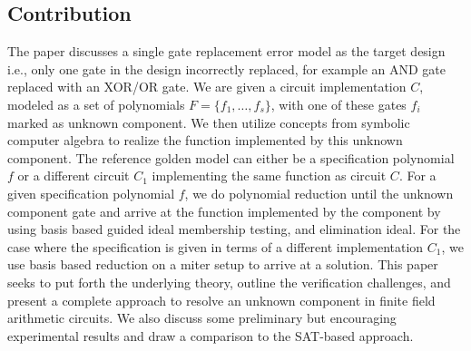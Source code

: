 \subsection{Contribution}
The paper discusses a single gate replacement error model as the target design i.e., only one gate in the design incorrectly replaced, for example an AND gate replaced with an XOR/OR gate. We are given a circuit implementation $C$, modeled as a set of polynomials $F=\{f_1,\dots,f_s\}$, with one of these gates $f_i$ marked as unknown component. We then utilize concepts from symbolic computer algebra to realize the function implemented by this unknown component. The reference golden model can either be a specification polynomial $f$ or a different circuit $C_1$ implementing the same function as circuit $C$. For a given specification polynomial $f$, we do polynomial reduction until the unknown component gate and arrive at the function implemented by the component by using \Grobner basis based guided ideal membership testing, and elimination ideal. For the case where the specification is given in terms of a different implementation $C_1$, we use \Grobner basis based reduction on a miter setup to arrive at a solution. %
This paper seeks to put forth the underlying theory, outline the verification challenges, and present a complete approach to resolve an unknown component in finite field arithmetic circuits. We also discuss some preliminary but encouraging experimental results and draw a comparison to the SAT-based approach.  


